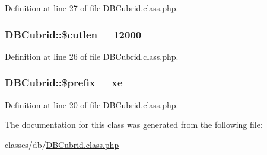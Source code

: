 Definition at line 27 of file D\+B\+Cubrid.\+class.\+php.

\subsubsection[{\texorpdfstring{\$cutlen}{$cutlen}}]{\setlength{\rightskip}{0pt plus 5cm}D\+B\+Cubrid\+::\$cutlen = 12000}\hypertarget{classDBCubrid_a0f61a81aecf7cd9829d0fc390b2895a5}{}\label{classDBCubrid_a0f61a81aecf7cd9829d0fc390b2895a5}


Definition at line 26 of file D\+B\+Cubrid.\+class.\+php.

\subsubsection[{\texorpdfstring{\$prefix}{$prefix}}]{\setlength{\rightskip}{0pt plus 5cm}D\+B\+Cubrid\+::\$prefix = \textquotesingle{}xe\+\_\+\textquotesingle{}}\hypertarget{classDBCubrid_a78aa323ac3bf494cbc63d3a2ae05a6f5}{}\label{classDBCubrid_a78aa323ac3bf494cbc63d3a2ae05a6f5}


Definition at line 20 of file D\+B\+Cubrid.\+class.\+php.



The documentation for this class was generated from the following file\+:\begin{DoxyCompactItemize}
\item 
classes/db/\hyperlink{DBCubrid_8class_8php}{D\+B\+Cubrid.\+class.\+php}\end{DoxyCompactItemize}
